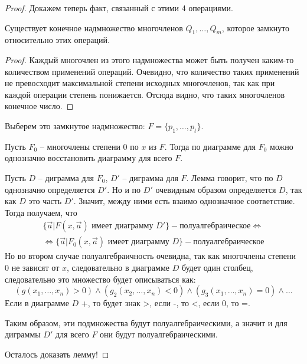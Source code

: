 \begin{proof}
    Докажем теперь факт, связанный с этими 4 операциями.
    \begin{lemma}
        Существует конечное надмножество многочленов $Q_1, \dots, Q_m$, которое замкнуто относительно этих операций.
    \end{lemma}
    \begin{proof}
        Каждый многочлен из этого надмножества может быть получен каким-то количеством применений операций. Очевидно, что количество таких применений не превосходит максимальной степени исходных многочленов, так как при каждой операции степень понижается. Отсюда видно, что таких многочленов конечное число. 
    \end{proof}
    Выберем это замкнутое надмножество: $F = \{p_1, \dots, p_t\}$.
    
    \begin{lemma}
        Пусть $F_0$ -- многочлены степени 0 по $x$ из $F$. Тогда по диаграмме для $F_0$ можно однозначно восстановить диаграмму для всего $F$.    
    \end{lemma}

    Пусть $D$ -- диграмма для $F_0$, $D'$ -- диграмма для $F$. Лемма говорит, что по $D$ однозначно определяется $D'$. Но и по $D'$ очевидным образом определяется $D$, так как $D$ это часть $D'$. Значит, между ними есть взаимо однозначное соответствие. Тогда получаем, что 
     \begin{gather*}
        \{ \overrightarrow{a} | F(x, \overrightarrow{a}) \text{ имеет диаграмму } D' \} - \text{полуалгебраическое} \Leftrightarrow \\ \Leftrightarrow
        \{ \overrightarrow{a} | F_0(x, \overrightarrow{a}) \text{ имеет диаграмму } D \} - \text{полуалгебраическое}
    \end{gather*}
    Но во втором случае полуалгебраичность очевидна, так как многочлены степени 0 не зависят от $x$, следовательно в диаграмме $D$ будет один столбец, следовательно это множество будет описываться как: \[ (g(x_1, \dots, x_n) > 0) \land (g_2(x_2, \dots, x_n) < 0) \land (g_3(x_1, \dots, x_n) = 0) \land \dots \]
    Если в диаграмме $D$ +, то будет знак >, если -, то <, если 0, то =.
    
    Таким образом, эти подмножества будут полуалгебраическими, а значит и для диграммы $D'$ для всего $F$ они будут полуалгебраическими.

    Осталось доказать лемму!


\end{proof}
